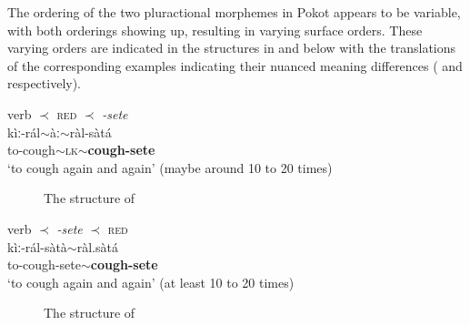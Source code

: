 \documentclass[output=paper,colorlinks,citecolor=brown
]{langscibook}
\begin{document}
\noindent The ordering of the two pluractional morphemes in Pokot appears to be variable, with both orderings showing up, resulting in varying surface orders. These varying orders are indicated in the structures in  and  below with the translations of the corresponding examples indicating their nuanced meaning differences ( and  respectively).



\ea verb $\prec$ \textsc{red} $\prec$ \textit{-sete} \label{ex:fiebig:varyB} \\
\gll kìː-rál$\sim$àː$\sim$ràl-sàtá\\
to-cough$\sim$\textsc{lk}$\sim$\textbf{cough-sete}\\
\glt `to cough again and again' (maybe around 10 to 20 times)
\z   
    
\begin{figure}
\caption{\label{fig:fiebig:varyB-structure}The structure of }
\end{figure}



\ea verb $\prec$ \textit{-sete} $\prec$ \textsc{red} \label{ex:fiebig:vary} \\
\gll kìː-rál-sàtà$\sim$ràl.sàtá\\
to-cough-sete$\sim$\textbf{cough-sete}\\
\glt `to cough again and again' (at least 10 to 20 times)
\z

\begin{figure}
\caption{The structure of }\label{fig:fiebig:vary-structure}
\end{figure}
\end{document}
